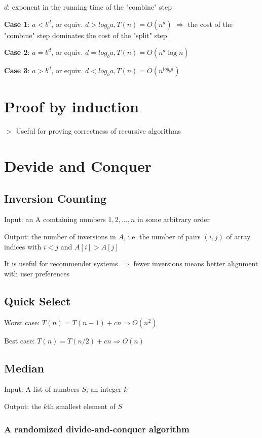 \documentclass[12pt,a4paper]{article}
\newcommand{\remark}[1]{
    $>$ {\color{blue} #1}
}
\begin{document}
$d$: exponent in the running time of the "combine" step

\textbf{Case 1}: $a < b^d$, or equiv. $d > log_ba, T(n) = O(n^d)$
$\Rightarrow$ the cost of the "combine" step dominates the cost of the "split" step

\textbf{Case 2}: $a = b^d$, or equiv. $d = log_ba, T(n) = O(n^d \log n)$

\textbf{Case 3}: $a > b^d$, or equiv. $d < log_ba, T(n) = O(n^{log_ba})$

\section*{Proof by induction}

\remark{Useful for proving correctness of recursive algorithms}

\section*{Devide and Conquer}

\subsection*{Inversion Counting}

Input: an A comtaining numbers $1,2,\dots,n$ in some arbitrary order

Output: the number of inversions in $A$, i.e. the number of pairs $(i,j)$ of array indices with $i < j$ and $A[i] > A[j]$

It is useful for recommender systems $\Rightarrow$ fewer inversions means better alignment with user preferences

\subsection*{Quick Select}

Worst case: $ T(n) = T(n-1) + cn \Rightarrow O(n^2)$

Best case: $ T(n) = T(n/2) + cn \Rightarrow O(n)$

\subsection*{Median}

Input: A list of numbers $S$; an integer $k$

Output: the $k$th smallest element of $S$

\subsubsection{A randomized divide-and-conquer algorithm}
\end{document}
